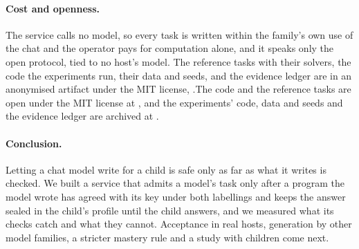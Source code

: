 \paragraph{Cost and openness.} The service calls no model, so every task is written within the family's own use of the chat and the operator pays for computation alone, and it speaks only the open protocol, tied to no host's model. \ifanonymous The reference tasks with their solvers, the code the experiments run, their data and seeds, and the evidence ledger are in an anonymised artifact under the MIT license, \ArtifactURL.\else The code and the reference tasks are open under the MIT license at \ArtifactURL, and the experiments' code, data and seeds and the evidence ledger are archived at .\fi

\paragraph{Conclusion.} Letting a chat model write for a child is safe only as far as what it writes is checked. We built a service that admits a model's task only after a program the model wrote has agreed with its key under both labellings and keeps the answer sealed in the child's profile until the child answers, and we measured what its checks catch and what they cannot. Acceptance in real hosts, generation by other model families, a stricter mastery rule and a study with children come next.
